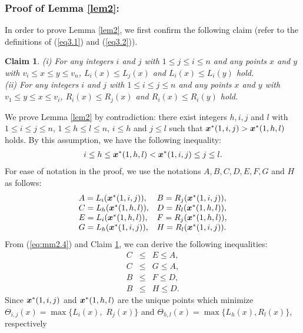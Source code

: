 \documentclass[a4paper]{llncs}
\newcommand{\bm}[1]{\mbox{\boldmath{$#1$}}}
\newtheorem{clm}{Claim}
\begin{document}
\subsubsection{Proof of Lemma \ref{lem2}:}
In order to prove Lemma \ref{lem2}, we first confirm the following claim (refer to the definitions of (\ref{eq3.1}) and (\ref{eq3.2})).
\begin{clm}
{\rm (i)} For any integers $i$ and $j$ with $1 \le j \le i \le n$ and any points $x$ and $y$ with $v_i \le x \le y \le v_n$,
$L_i(x) \le L_j(x)$ and $L_i(x) \le L_i(y)$ hold.\\
{\rm (ii)} For any integers $i$ and $j$ with $1 \le i \le j \le n$ and any points $x$ and $y$ with $v_1 \le y \le x \le v_i$,
$R_i(x) \le R_j(x)$ and $R_i(x) \le R_i(y)$ hold.
\label{clm:mm2.1}
\end{clm}
We prove Lemma \ref{lem2} by contradiction: 
there exist integers $h, i, j$ and $l$ with $1 \le i \le j \le n$, $1 \le h \le l \le n$, $i \le h$ and $j \le l$ such that
${\bm x}^*(1, i, j) > {\bm x}^*(1, h, l)$ holds.
By this assumption, we have the following inequality:
\begin{eqnarray}
i \le h \le {\bm x}^*(1, h, l) < {\bm x}^*(1, i, j) \le j \le l.
\label{eq:mm2.4}
\end{eqnarray}
For ease of notation in the proof, we use the notations $A, B, C, D, E, F, G$ and $H$ as follows:
\begin{eqnarray}
\begin{array}{ll}
A = L_i({\bm x}^*(1, i, j)),		&	B = R_j({\bm x}^*(1, i, j)), \\
C = L_h({\bm x}^*(1, h, l)),		&	D = R_l({\bm x}^*(1, h, l)), \\
E = L_i({\bm x}^*(1, h, l)),		&	F = R_j({\bm x}^*(1, h, l)), \\
G = L_h({\bm x}^*(1, i, j)),		&	H = R_l({\bm x}^*(1, i, j)).
\end{array}
\label{eq:mm2.1}
\end{eqnarray}
From (\ref{eq:mm2.4}) and Claim \ref{clm:mm2.1}, we can derive the following inequalities:
\begin{eqnarray}
C &\le& E \le A, \label{eq:mm2.5} \\
C &\le& G \le A, \label{eq:mm2.6} \\
B &\le& F \le D, \label{eq:mm2.7} \\
B &\le& H \le D. \label{eq:mm2.8}
\end{eqnarray}
Since ${\bm x}^*(1, i, j)$ and ${\bm x}^*(1, h, l)$ are the unique points which minimize $\Theta_{i, j}(x) = \max \{ L_i(x),$ $R_j(x)\}$ and $\Theta_{h, l}(x) = \max \{ L_h(x), R_l(x)\}$, respectively
\end{document}
